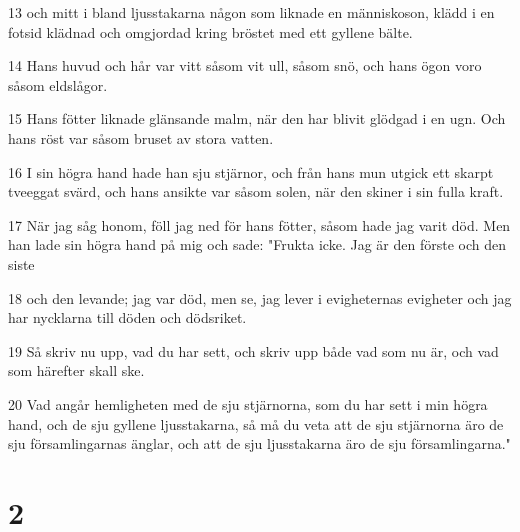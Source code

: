 \par 13 och mitt i bland ljusstakarna någon som liknade en människoson, klädd i en fotsid klädnad och omgjordad kring bröstet med ett gyllene bälte.
\par 14 Hans huvud och hår var vitt såsom vit ull, såsom snö, och hans ögon voro såsom eldslågor.
\par 15 Hans fötter liknade glänsande malm, när den har blivit glödgad i en ugn. Och hans röst var såsom bruset av stora vatten.
\par 16 I sin högra hand hade han sju stjärnor, och från hans mun utgick ett skarpt tveeggat svärd, och hans ansikte var såsom solen, när den skiner i sin fulla kraft.
\par 17 När jag såg honom, föll jag ned för hans fötter, såsom hade jag varit död. Men han lade sin högra hand på mig och sade: "Frukta icke. Jag är den förste och den siste
\par 18 och den levande; jag var död, men se, jag lever i evigheternas evigheter och jag har nycklarna till döden och dödsriket.
\par 19 Så skriv nu upp, vad du har sett, och skriv upp både vad som nu är, och vad som härefter skall ske.
\par 20 Vad angår hemligheten med de sju stjärnorna, som du har sett i min högra hand, och de sju gyllene ljusstakarna, så må du veta att de sju stjärnorna äro de sju församlingarnas änglar, och att de sju ljusstakarna äro de sju församlingarna."

\chapter{2}

